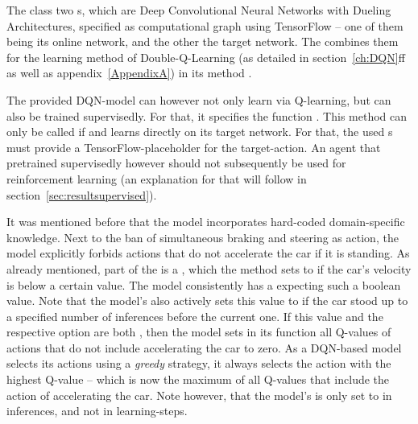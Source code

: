 The class   two s, which are Deep Convolutional Neural Networks with Dueling Architectures, specified as computational graph using TensorFlow -- one of them being its online network, and the other the target network. The  combines them for the learning method of Double-Q-Learning (as detailed in section~\ref{ch:DQN}ff as well as appendix~\ref{AppendixA}) in its method . 

The provided DQN-model can however not only learn via Q-learning, but can also be trained supervisedly. For that, it specifies the function . This method can only be called if  and learns directly on its target network. For that, the used s must provide a TensorFlow-placeholder for the target-action. An agent that pretrained supervisedly however should not subsequently be used for reinforcement learning (an explanation for that will follow in section~\ref{sec:resultsupervised}).

It was mentioned before that the model incorporates hard-coded domain-specific knowledge. Next to the ban of simultaneous braking and steering as action, the model explicitly forbids actions that do not accelerate the car if it is standing. As already mentioned, part of the  is a , which the method  sets to  if the car's velocity is below a certain value. The model consistently has a  expecting such a boolean value. Note that the model's  also actively sets this value to  if the car stood up to a specified number of inferences before the current one. If this value and the respective option  are both , then the model sets in its function  all Q-values of actions that do not include accelerating the car to zero. As a DQN-based model selects its actions using a \textit{greedy} strategy, it always selects the action with the highest Q-value -- which is now the maximum of all Q-values that include the action of accelerating the car. Note however, that the model's  is only set to  in inferences, and not in learning-steps.

